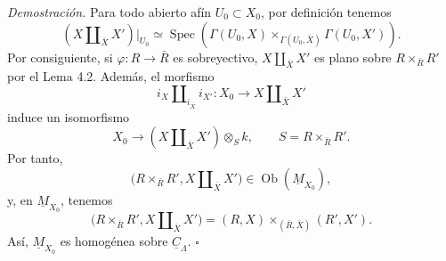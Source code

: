 \medskip
\noindent\textit{Demostración.}
Para todo abierto afín $U_0\subset X_0$, por definición tenemos
\[
 (X\amalg_{\bar X}X')|_{U_0}
 \simeq
 \operatorname{Spec}\!\left(
   \Gamma(U_0,X)
   \times_{\Gamma(U_0,\bar X)}
   \Gamma(U_0,X')
 \right).
\]
Por consiguiente, si $\varphi:R\longrightarrow\bar R$ es
sobreyectivo, $X\amalg_{\bar X}X'$ es plano sobre
$R\times_{\bar R}R'$ por el Lema 4.2. Además, el morfismo
\[
 i_X\amalg_{i_{\bar X}}i_{X'}:
 X_0\longrightarrow X\amalg_{\bar X}X'
\]
induce un isomorfismo
\[
 X_0\longrightarrow (X\amalg_{\bar X}X')\otimes_Sk,
 \qquad S=R\times_{\bar R}R'.
\]
Por tanto,
\[
 \bigl(R\times_{\bar R}R',X\amalg_{\bar X}X'\bigr)
 \in\operatorname{Ob}(\underline M_{X_0}),
\]
y, en $\underline M_{X_0}$, tenemos
\[
 \bigl(R\times_{\bar R}R',X\amalg_{\bar X}X'\bigr)
 =
 (R,X)\times_{(\bar R,\bar X)}(R',X').
\]
Así, $\underline M_{X_0}$ es homogénea sobre
$\underline C_\Lambda$. \hfill$\square$

